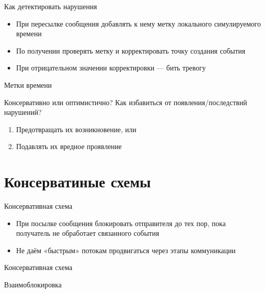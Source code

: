 \documentclass{beamer}
\begin{document}
\begin{frame}{Как детектировать нарушения}

\begin{itemize}
\item При пересылке сообщения добавлять к нему метку локального симулируемого времени
\item По получении проверять метку и корректировать точку создания события
\item При отрицательном значении корректировки — бить тревогу
\end{itemize}

\end{frame}

\begin{frame}{Метки времени}
\centering

\end{frame}

\begin{frame}{Консервативно или оптимистично?}
Как избавиться от появления/последствий нарушений?

\begin{enumerate}
    \item Предотвращать их возникновение, или
    \item Подавлять их вредное проявление
\end{enumerate}

\end{frame}

\section{Консерватиные схемы}
\begin{frame}{Консервативная схема}
\begin{itemize}
    \item При посылке сообщения блокировать отправителя до тех пор, пока получатель не обработает связанного события
    \item Не даём «быстрым» потокам продвигаться через этапы коммуникации
\end{itemize}
\end{frame}

\begin{frame}{Консервативная схема}
\centering
    
\end{frame}

\begin{frame}{Взаимоблокировка}
\centering


\end{frame}
\end{document}
